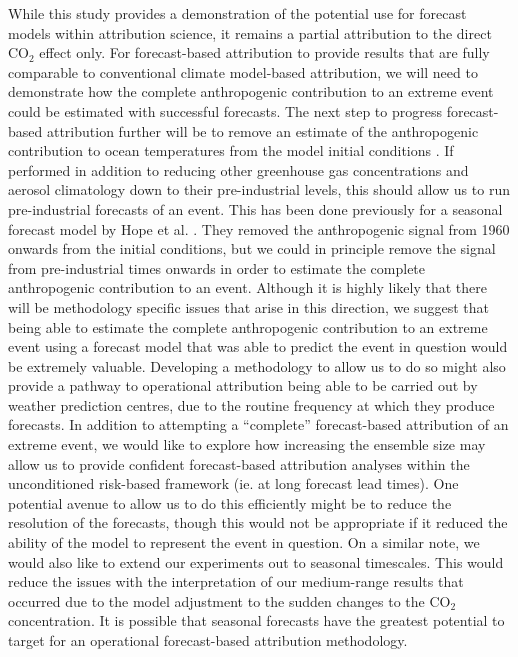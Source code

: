   While this study provides a demonstration of the potential use for forecast models within attribution science, it remains a partial attribution to the direct CO$_2$ effect only. For forecast-based attribution to provide results that are fully comparable to conventional climate model-based attribution, we will need to demonstrate how the complete anthropogenic contribution to an extreme event could be estimated with successful forecasts. The next step to progress forecast-based attribution further will be to remove an estimate of the anthropogenic contribution to ocean temperatures from the model initial conditions \citep[e.g.][]{stone_benchmark_2021}. If performed in addition to reducing other greenhouse gas concentrations and aerosol climatology down to their pre-industrial levels, this should allow us to run pre-industrial forecasts of an event. This has been done previously for a seasonal forecast model by Hope et al. \citep{hope_contributors_2015,hope_what_2016,hope_determining_2019}. They removed the anthropogenic signal from 1960 onwards from the initial conditions, but we could in principle remove the signal from pre-industrial times onwards in order to estimate the complete anthropogenic contribution to an event. Although it is highly likely that there will be methodology specific issues that arise in this direction, we suggest that being able to estimate the complete anthropogenic contribution to an extreme event using a forecast model that was able to predict the event in question would be extremely valuable. Developing a methodology to allow us to do so might also provide a pathway to operational attribution being able to be carried out by weather prediction centres, due to the routine frequency at which they produce forecasts. In addition to attempting a ``complete'' forecast-based attribution of an extreme event, we would like to explore how increasing the ensemble size may allow us to provide confident forecast-based attribution analyses within the unconditioned risk-based framework (ie. at long forecast lead times). One potential avenue to allow us to do this efficiently might be to reduce the resolution of the forecasts, though this would not be appropriate if it reduced the ability of the model to represent the event in question. On a similar note, we would also like to extend our experiments out to seasonal timescales. This would reduce the issues with the interpretation of our medium-range results that occurred due to the model adjustment to the sudden changes to the CO$_2$ concentration. It is possible that seasonal forecasts have the greatest potential to target for an operational forecast-based attribution methodology.

